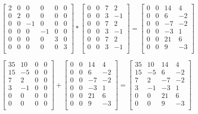\documentclass{article}
\begin{document}
$
\begin{bmatrix}
2&0&0&0&0&0\\
0&2&0&0&0&0\\
0&0&-1&0&0&0\\
0&0&0&-1&0&0\\
0&0&0&0&3&0\\
0&0&0&0&0&3\\
\end{bmatrix}
*
\begin{bmatrix}
0&0&7&2\\
0&0&3&-1\\
0&0&7&2\\
0&0&3&-1\\
0&0&7&2\\
0&0&3&-1\\
\end{bmatrix}
=
\begin{bmatrix}
0&0&14&4\\
0&0&6&-2\\
0&0&-7&-2\\
0&0&-3&1\\
0&0&21&6\\
0&0&9&-3\\
\end{bmatrix}
$
\vspace{1cm} 

$
\begin{bmatrix}
35&10&0&0\\
15&-5&0&0\\
7&2&0&0\\
3&-1&0&0\\
0&0&0&0\\
0&0&0&0\\
\end{bmatrix}
+
\begin{bmatrix}
0&0&14&4\\
0&0&6&-2\\
0&0&-7&-2\\
0&0&-3&1\\
0&0&21&6\\
0&0&9&-3\\
\end{bmatrix}
= 
\begin{bmatrix}
35&10&14&4\\
15&-5&6&-2\\
7&2&-7&-2\\
3&-1&-3&1\\
0&0&21&6\\
0&0&9&-3\\
\end{bmatrix}
$
\end{document}
